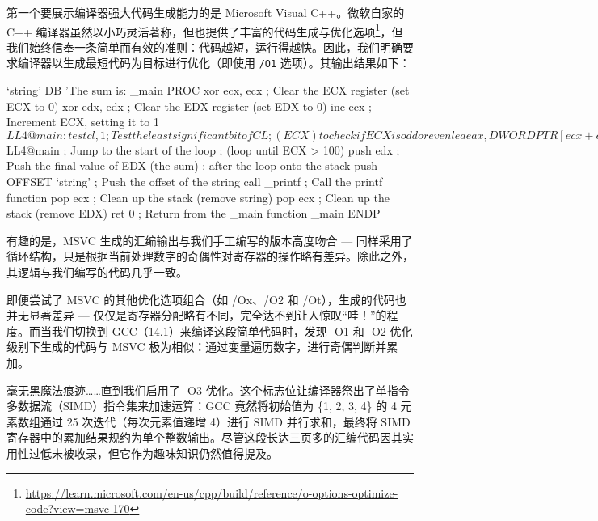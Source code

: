第一个要展示编译器强大代码生成能力的是 Microsoft Visual C++。微软自家的 C++ 编译器虽然以小巧灵活著称，但也提供了丰富的代码生成与优化选项\footnote{\url{https://learn.microsoft.com/en-us/cpp/build/reference/o-options-optimize-code?view=msvc-170}}，但我们始终信奉一条简单而有效的准则：代码越短，运行得越快。因此，我们明确要求编译器以生成最短代码为目标进行优化（即使用 \verb|/O1| 选项）。其输出结果如下：

\begin{shell}
`string' DB 'The sum is: %
_main PROC
  xor ecx, ecx  ; Clear the ECX register (set ECX to 0)
  xor edx, edx  ; Clear the EDX register (set EDX to 0)
  inc ecx       ; Increment ECX, setting it to 1
  $LL4@main:
  test cl, 1    ; Test the least significant bit of CL
                ; (ECX) to check if ECX is odd or even
  lea eax, DWORD PTR [ecx+edx] ; Load the effective
                ; address of ECX + EDX into EAX
  cmove eax, edx; If the zero flag is set
                ; (ECX was even), move EDX into EAX
  inc ecx       ; Increment ECX by 1
  mov edx, eax  ; Move the value in EAX to EDX
                ; (update EDX for the next iteration)
  cmp ecx, 100  ; Compare ECX with 100
  jle SHORT $LL4@main ; Jump to the start of the loop
                ; (loop until ECX > 100)
  push edx      ; Push the final value of EDX (the sum)
                ; after the loop onto the stack
  push OFFSET `string' ; Push the offset of the string
  call _printf  ; Call the printf function
  pop ecx       ; Clean up the stack (remove string)
  pop ecx       ; Clean up the stack (remove EDX)
  ret 0         ; Return from the _main function
_main ENDP
\end{shell}

有趣的是，MSVC 生成的汇编输出与我们手工编写的版本高度吻合 --- 同样采用了循环结构，只是根据当前处理数字的奇偶性对寄存器的操作略有差异。除此之外，其逻辑与我们编写的代码几乎一致。

即便尝试了 MSVC 的其他优化选项组合（如 /Ox、/O2 和 /Ot），生成的代码也并无显著差异 --- 仅仅是寄存器分配略有不同，完全达不到让人惊叹“哇！”的程度。而当我们切换到 GCC（14.1）来编译这段简单代码时，发现 -O1 和 -O2 优化级别下生成的代码与 MSVC 极为相似：通过变量遍历数字，进行奇偶判断并累加。

毫无黑魔法痕迹……直到我们启用了 -O3 优化。这个标志位让编译器祭出了单指令多数据流（SIMD）指令集来加速运算：GCC 竟然将初始值为 \{1, 2, 3, 4\} 的 4 元素数组通过 25 次迭代（每次元素值递增 4）进行 SIMD 并行求和，最终将 SIMD 寄存器中的累加结果规约为单个整数输出。尽管这段长达三页多的汇编代码因其实用性过低未被收录，但它作为趣味知识仍然值得提及。

